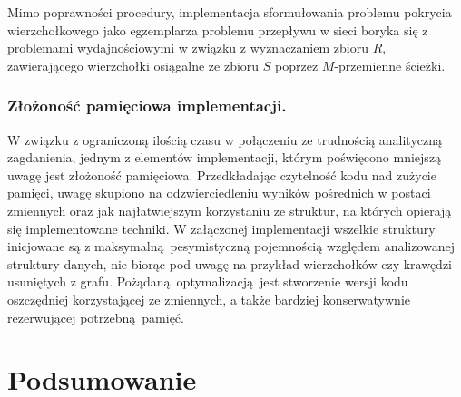   Mimo poprawności procedury, implementacja sformułowania problemu pokrycia wierzchołkowego jako egzemplarza problemu przepływu w sieci boryka się z problemami wydajnościowymi w związku z wyznaczaniem zbioru $R$, zawierającego wierzchołki osiągalne ze zbioru $S$ poprzez $M$-przemienne ścieżki.

  \subsubsection{\textbf{Złożoność pamięciowa implementacji.}}

  W związku z ograniczoną ilością czasu w połączeniu ze trudnością analityczną zagdanienia, jednym z elementów implementacji, którym poświęcono mniejszą uwagę jest złożoność pamięciowa.
  Przedkładając czytelność kodu nad zużycie pamięci, uwagę skupiono na odzwierciedleniu wyników pośrednich w postaci zmiennych oraz jak najłatwiejszym korzystaniu ze struktur, na których opierają się implementowane techniki.
  W załączonej implementacji wszelkie struktury inicjowane są z maksymalną pesymistyczną pojemnością względem analizowanej struktury danych, nie biorąc pod uwagę na przykład wierzchołków czy krawędzi usuniętych z grafu.
  Pożądaną optymalizacją jest stworzenie wersji kodu oszczędniej korzystającej ze zmiennych, a także bardziej konserwatywnie rezerwującej potrzebną pamięć.
\section{Podsumowanie}